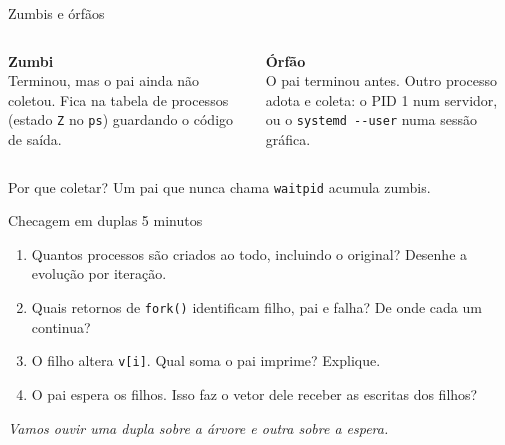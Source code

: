 \documentclass[aspectratio=169]{beamer}
\begin{document}
\begin{frame}{Zumbis e órfãos}
\begin{center}
\end{center}

\begin{columns}[T]
\textbf{Zumbi}\\
\small Terminou, mas o pai ainda não coletou. Fica na tabela de processos (estado \texttt{Z} no \texttt{ps}) guardando o código de saída.

\textbf{Órfão}\\
\small O pai terminou antes. Outro processo adota e coleta: o PID 1 num servidor, ou o \texttt{systemd -{}-user} numa sessão gráfica.
\end{columns}

\vspace{0.6em}
\begin{alertblock}{Por que coletar?}
Um pai que nunca chama \texttt{waitpid} acumula zumbis.
\end{alertblock}
\end{frame}

\begin{frame}{Checagem em duplas \hfill \normalsize 5 minutos}
\begin{enumerate}
    \item Quantos processos são criados ao todo, incluindo o original? Desenhe a evolução por iteração.
    \item Quais retornos de \texttt{fork()} identificam filho, pai e falha? De onde cada um continua?
    \item O filho altera \texttt{v[i]}. Qual soma o pai imprime? Explique.
    \item O pai espera os filhos. Isso faz o vetor dele receber as escritas dos filhos?
\end{enumerate}

\vspace{0.6em}
\centering \emph{Vamos ouvir uma dupla sobre a árvore e outra sobre a espera.}
\end{frame}
\end{document}
